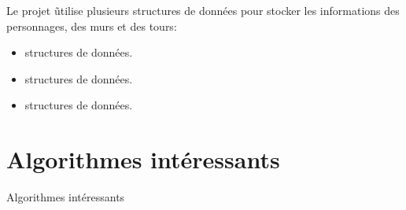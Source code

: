 Le projet \nom\~utilise plusieurs structures de données pour stocker les informations des personnages, des murs et des tours:

\begin{itemize}
    \item \textcolor{cardinal}{structures de données}.
    \item \textcolor{cardinal}{structures de données}.
    \item \textcolor{cardinal}{structures de données}.
\end{itemize}

\section{Algorithmes intéressants}

\textcolor{cardinal}{Algorithmes intéressants}

  
    
   
  
  
\bigskip
